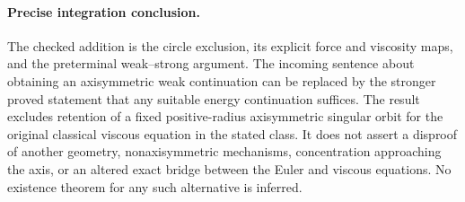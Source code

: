 \paragraph{Precise integration conclusion.}
The checked addition is the circle exclusion, its explicit force and
viscosity maps, and the preterminal weak--strong argument. The incoming
sentence about obtaining an axisymmetric weak continuation can be
replaced by the stronger proved statement that any suitable energy
continuation suffices. The result excludes retention of a fixed
positive-radius axisymmetric singular orbit for the original classical
viscous equation in the stated class. It does not assert a disproof of
another geometry, nonaxisymmetric mechanisms, concentration approaching
the axis, or an altered exact bridge between the Euler and viscous
equations. No existence theorem for any such alternative is inferred.


